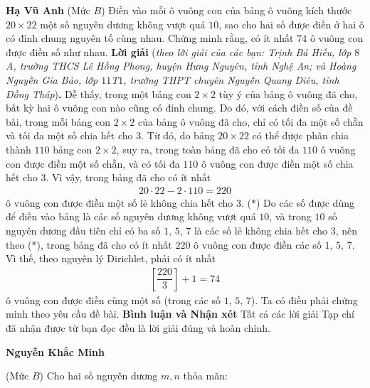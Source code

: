 \begin{multicols}{2}
	\vskip 0.05cm
	\hfill	\textbf{\color{thachthuctoanhoc}Hạ Vũ Anh}
	\vskip 0.01cm
	\columnbreak
	{}
	(Mức $B$) Điền vào mỗi ô vuông con của bảng ô vuông kích thước $20\times 22$ một số nguyên dương không vượt quá $10$, sao cho hai số được điền ở hai ô có đỉnh chung nguyên tố cùng nhau. Chứng minh rằng, có ít nhất $74$ ô vuông con được điền số như nhau.
	\vskip 0.05cm
	\textbf{\color{thachthuctoanhoc}Lời giải} (\textit{theo lời giải của các bạn: Trịnh Bá Hiếu, lớp $8$A, trường THCS Lê Hồng Phong, huyện Hưng Nguyên, tỉnh Nghệ An; và Hoàng Nguyễn Gia Bảo, lớp $11$T$1$, trường THPT chuyên Nguyễn Quang Diêu, tỉnh Đồng Tháp})\textbf{\color{thachthuctoanhoc}.}
	\vskip 0.05cm
	Dễ thấy, trong một bảng con $2 \times 2$ tùy ý của bảng ô vuông đã cho, bất kỳ hai ô vuông con nào cũng có đỉnh chung. Do đó, với cách điền số của đề bài, trong mỗi bảng con $2 \times 2$ của bảng ô vuông đã cho, chỉ có tối đa một số chẵn và tối đa một số chia hết cho $3$.
	\vskip 0.05cm
	Từ đó, do bảng $20 \times 22$ có thể được phân chia thành $110$ bảng con $2 \times 2$, suy ra, trong toàn bảng đã cho có tối đa $110$ ô vuông con được điền một số chẵn, và có tối đa $110$ ô vuông con được điền một số chia hết cho $3$. Vì vậy, trong bảng đã cho có ít nhất
	\begin{align*}
		20 \cdot 22 - 2 \cdot 110 = 220
	\end{align*}
	ô vuông con được điền một số lẻ không chia hết cho $3$. \hfill ($*$)
	\vskip 0.05cm
	Do các số được dùng để điền vào bảng là các số nguyên dương không vượt quá $10$, và trong $10$ số nguyên dương đầu tiên chỉ có ba số $1$, $5$, $7$ là các số lẻ không chia hết cho $3$, nên theo ($*$), trong bảng đã cho có ít nhất $220$ ô vuông con được điền các số $1$, $5$, $7$. Vì thế, theo nguyên lý Dirichlet, phải có ít nhất
	\begin{align*}
		\left[ {\dfrac{{220}}{3}} \right] + 1 = 74
	\end{align*}
	ô vuông con được điền cùng một số (trong các số $1$, $5$, $7$).
	\vskip 0.05cm
	Ta có điều phải chứng minh theo yêu cầu đề bài.
	\vskip 0.05cm
	\textbf{\color{thachthuctoanhoc}Bình luận và Nhận xét}
	\vskip 0.05cm
	Tất cả các lời giải Tạp chí đã nhận được từ bạn đọc đều là lời giải đúng và hoàn chỉnh.
	\begin{flushright}
		\textbf{\color{thachthuctoanhoc}Nguyễn Khắc Minh}
	\end{flushright}
	{}
	(Mức $B$) Cho hai số nguyên dương $m, n$ thỏa mãn:
	\vskip 0.05cm

\end{multicols}
